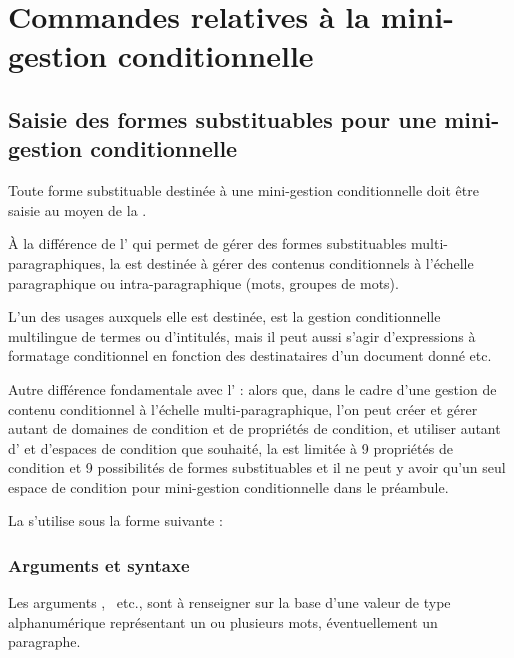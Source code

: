 \documentclass{article}
\begin{document}
\section{Commandes relatives à la mini-gestion conditionnelle}
\subsection{Saisie des formes substituables pour une mini-gestion conditionnelle}\label{CtDoc_Commandes_MiniCondiText}
Toute forme substituable destinée à une mini-gestion conditionnelle doit être saisie au moyen de la .

À la différence de l' qui permet de gérer des formes substituables multi-paragraphiques, la  est destinée à gérer des contenus conditionnels à l'échelle paragraphique ou intra-paragraphique (mots, groupes de mots).

L'un des usages auxquels elle est destinée, est la gestion conditionnelle multilingue de termes ou d'intitulés, mais il peut aussi s'agir d'expressions à formatage conditionnel en fonction des destinataires d'un document donné etc.

Autre différence fondamentale avec l' : alors que, dans le cadre d'une gestion de contenu conditionnel à l'échelle multi-paragraphique, l'on peut créer et gérer autant de domaines de condition et de propriétés de condition, et utiliser autant d' et d'espaces de condition que souhaité, la  est limitée à 9 propriétés de condition et 9 possibilités de formes substituables et il ne peut y avoir qu'un seul espace de condition pour mini-gestion conditionnelle dans le préambule.

La  s'utilise sous la forme suivante :



\subsubsection{Arguments et syntaxe}
Les arguments , ~etc., sont à renseigner sur la base d'une valeur de type alphanumérique représentant un ou plusieurs mots, éventuellement un paragraphe.
\end{document}
